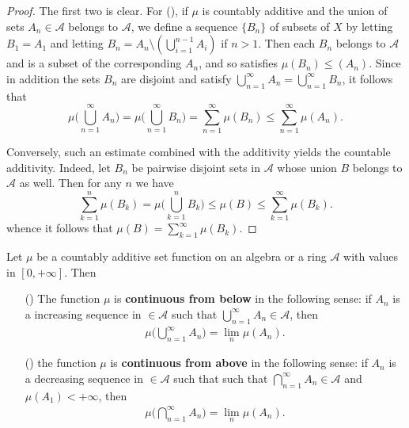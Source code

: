 \begin{proof}
The first two is clear. For (), if $\mu$ is countably additive and the union of sets $A_n\in\mathcal{A}$ belongs to $\mathcal{A}$, we define a sequence $\{B_n\}$ of subsets of $X$ by letting $B_1=A_1$ and letting $B_n=A_n\setminus(\bigcup_{i=1}^{n-1}A_i)$ if $n>1$. Then each $B_n$ belongs to $\mathcal{A}$ and is a subset of the corresponding $A_n$, and so satisfies $\mu(B_n)\leq(A_n)$. Since in addition the sets $B_n$ are
disjoint and satisfy $\bigcup_{n=1}^{\infty}A_n=\bigcup_{n=1}^{\infty}B_n$, it follows that 
\[\mu\Big(\bigcup_{n=1}^{\infty}A_n\Big)=\mu\Big(\bigcup_{n=1}^{\infty}B_n\Big)=\sum_{n=1}^{\infty}\mu(B_n)\leq\sum_{n=1}^{\infty}\mu(A_n).\]

Conversely, such an estimate combined with the additivity yields the countable additivity. Indeed, let $B_n$ be pairwise disjoint sets in $\mathcal{A}$ whose union $B$ belongs to $\mathcal{A}$ as well. Then for any $n$ we have
\[\sum_{k=1}^{n}\mu(B_k)=\mu\Big(\bigcup_{k=1}^{n}B_k\Big)\leq\mu(B)\leq\sum_{k=1}^{\infty}\mu(B_k).\]
whence it follows that $\mu(B)=\sum_{k=1}^{\infty}\mu(B_k)$.
\end{proof}
\begin{proposition}\label{measure sigma-add continuous}
Let $\mu$ be a countably additive set function on an algebra or a ring $\mathcal{A}$ with values in $[0,+\infty]$. Then
\begin{itemize}
\item[(\rmnum{1})]
The function $\mu$ is \textbf{continuous from below} in the following sense: if $A_n$ is a increasing sequence in $\in\mathcal{A}$ such that $\bigcup_{n=1}^{\infty}A_n\in\mathcal{A}$,
then
\begin{align}\label{measure continuous from below def}
\mu\Big(\bigcup_{n=1}^{\infty}A_n\Big)=\lim_n\mu(A_n).
\end{align}
\item[(\rmnum{2})] the function $\mu$ is \textbf{continuous from above} in the following sense: if $A_n$ is a decreasing sequence in $\in\mathcal{A}$ such that such that $\bigcap_{n=1}^{\infty}A_n\in\mathcal{A}$ and $\mu(A_1)<+\infty$, then 
\begin{align}\label{measure continuous from above def}
\mu\Big(\bigcap_{n=1}^{\infty}A_n\Big)=\lim_n\mu(A_n).
\end{align}
\end{itemize}
\end{proposition}
